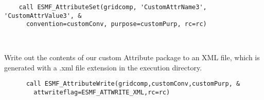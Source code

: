 
 \begin{verbatim}
    call ESMF_AttributeSet(gridcomp, 'CustomAttrName3', 'CustomAttrValue3', &
      convention=customConv, purpose=customPurp, rc=rc)

 
\end{verbatim}
 

       Write out the contents of our custom Attribute package to an XML file,
       which is generated with a .xml file extension in the execution directory.  

 \begin{verbatim}
      call ESMF_AttributeWrite(gridcomp,customConv,customPurp, &
        attwriteflag=ESMF_ATTWRITE_XML,rc=rc)

 
\end{verbatim}

\setlength{\parskip}{\oldparskip}
\setlength{\parindent}{\oldparindent}
\setlength{\baselineskip}{\oldbaselineskip}
